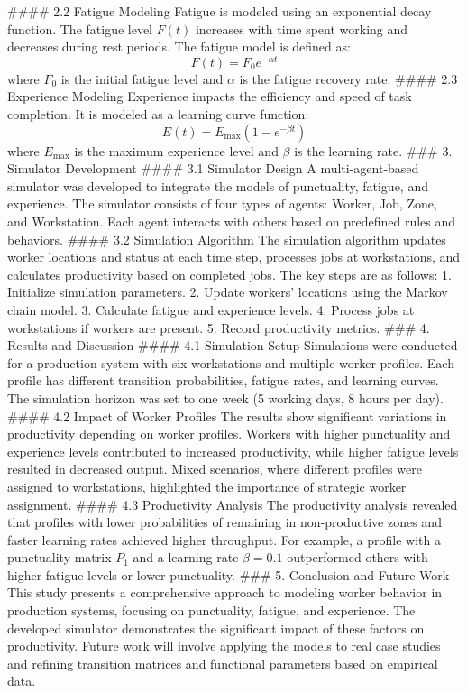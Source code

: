 #### 2.2 Fatigue Modeling
Fatigue is modeled using an exponential decay function. The fatigue level \( F(t) \) increases with time spent working and decreases during rest periods. The fatigue model is defined as:
\[ F(t) = F_{0} e^{-\alpha t} \]
where \( F_{0} \) is the initial fatigue level and \( \alpha \) is the fatigue recovery rate.
#### 2.3 Experience Modeling
Experience impacts the efficiency and speed of task completion. It is modeled as a learning curve function:
\[ E(t) = E_{\text{max}} \left(1 - e^{-\beta t}\right) \]
where \( E_{\text{max}} \) is the maximum experience level and \( \beta \) is the learning rate.
### 3. Simulator Development
#### 3.1 Simulator Design
A multi-agent-based simulator was developed to integrate the models of punctuality, fatigue, and experience. The simulator consists of four types of agents: Worker, Job, Zone, and Workstation. Each agent interacts with others based on predefined rules and behaviors.
#### 3.2 Simulation Algorithm
The simulation algorithm updates worker locations and status at each time step, processes jobs at workstations, and calculates productivity based on completed jobs. The key steps are as follows:
1. Initialize simulation parameters.
2. Update workers' locations using the Markov chain model.
3. Calculate fatigue and experience levels.
4. Process jobs at workstations if workers are present.
5. Record productivity metrics.
### 4. Results and Discussion
#### 4.1 Simulation Setup
Simulations were conducted for a production system with six workstations and multiple worker profiles. Each profile has different transition probabilities, fatigue rates, and learning curves. The simulation horizon was set to one week (5 working days, 8 hours per day).
#### 4.2 Impact of Worker Profiles
The results show significant variations in productivity depending on worker profiles. Workers with higher punctuality and experience levels contributed to increased productivity, while higher fatigue levels resulted in decreased output. Mixed scenarios, where different profiles were assigned to workstations, highlighted the importance of strategic worker assignment.
#### 4.3 Productivity Analysis
The productivity analysis revealed that profiles with lower probabilities of remaining in non-productive zones and faster learning rates achieved higher throughput. For example, a profile with a punctuality matrix \( P_1 \) and a learning rate \( \beta = 0.1 \) outperformed others with higher fatigue levels or lower punctuality.
### 5. Conclusion and Future Work
This study presents a comprehensive approach to modeling worker behavior in production systems, focusing on punctuality, fatigue, and experience. The developed simulator demonstrates the significant impact of these factors on productivity. Future work will involve applying the models to real case studies and refining transition matrices and functional parameters based on empirical data.
